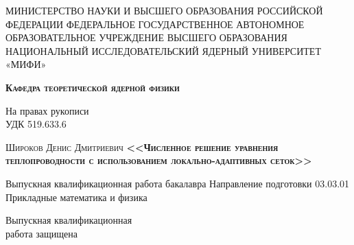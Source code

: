 \begin{titlepage}
    \newpage
    
    \begin{center}
    МИНИСТЕРСТВО НАУКИ И ВЫСШЕГО ОБРАЗОВАНИЯ РОССИЙСКОЙ ФЕДЕРАЦИИ ФЕДЕРАЛЬНОЕ ГОСУДАРСТВЕННОЕ АВТОНОМНОЕ ОБРАЗОВАТЕЛЬНОЕ УЧРЕЖДЕНИЕ ВЫСШЕГО ОБРАЗОВАНИЯ НАЦИОНАЛЬНЫЙ ИССЛЕДОВАТЕЛЬСКИЙ ЯДЕРНЫЙ УНИВЕРСИТЕТ «МИФИ» \\
    \end{center}
    
    \vspace{0.5em} %
    
    \begin{center}
        \textsc{\textbf{Кафедра теоретической ядерной физики\\}}
    \end{center}
    \begin{flushright}
        На правах рукописи\\
        УДК 519.633.6\\
    \end{flushright}
    \begin{center}
        \textsc{\Large Широков Денис Дмитриевич\linebreak  \linebreak  \Large \textbf{ <<Численное решение уравнения теплопроводности с использованием локально-адаптивных сеток>>}}
    \end{center} 
    
    \vspace{1em}
    
    \begin{center}
    Выпускная квалификационная работа бакалавра \linebreak Направление подготовки 03.03.01 Прикладные математика и физика
    \end{center}
    
    \vspace{1em}
    
   
    \newbox{\lbox}
    \newlength{\maxl}
    \setlength{\maxl}{\wd\lbox}
    \hfill\parbox{9cm}{
    \hspace*{1.5cm}\hspace*{-3cm}Выпускная квалификационная\\ \hspace*{1.5cm}\hspace*{-3cm}работа защищена\\ 
    
}
\end{titlepage}
